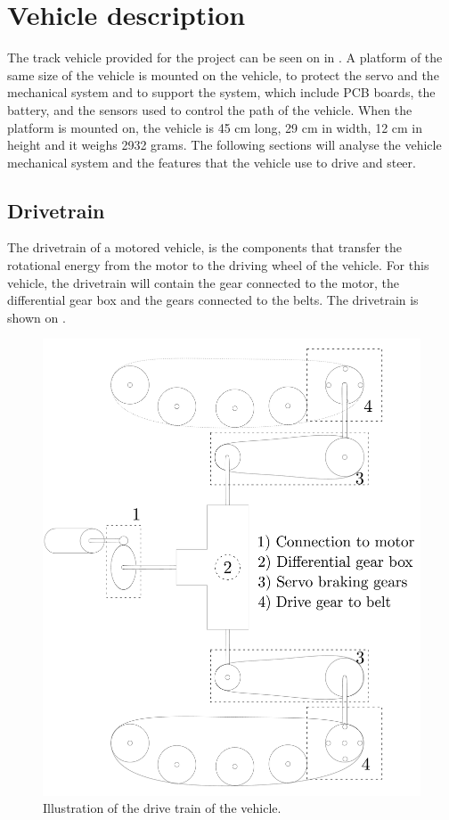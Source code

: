 \section{Vehicle description}
The track vehicle provided for the project can be seen on  in . A platform of the same size of the vehicle  is mounted on the vehicle, to protect the servo and the mechanical system and to support the system, which include PCB boards, the battery, and the sensors used to control the path of the vehicle. When the platform is mounted on, the vehicle is 45 cm long, 29 cm in width, 12 cm in height and it weighs 2932 grams.
The following sections will analyse the vehicle mechanical system and the features that the vehicle use to drive and steer.

\subsection{Drivetrain}

The drivetrain of a motored vehicle, is the components that transfer the rotational energy from the motor to the driving wheel of the vehicle. For this vehicle, the drivetrain will contain the gear connected to the motor, the differential gear box and the gears connected to the belts. The drivetrain is shown on .

\begin{figure}[H]
	\centering
	\includegraphics[scale=0.2]{figures/vehicleDescriptionDriveTrain.pdf}
	\caption{Illustration of the drive train of the vehicle.}
	\label{vehicleDescriptionDriveTrain}
\end{figure}

